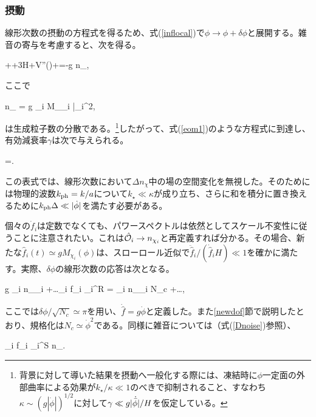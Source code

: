 \subsubsection{摂動}

線形次数の摂動の方程式を得るため、式(\ref{inflocal})で$\phi\to\phi+\delta\phi$と展開する。雑音の寄与を考慮すると、次を得る。

\be
\label{pertinflocal}
\ddot{\delta\phi}+\delta\phi+3H\dot{\delta\phi}+V''(\phi)\delta\phi+\dot{\delta\phi}=-g \Delta n_{\chi},\ee

ここで

\beq \label{Dnoise} \Delta n_{\chi} = g \sum_i M_{\chi_i} \Delta \bar \chi_i^2, \eeq

は生成粒子数の分散である。\footnote{背景に対して導いた結果を摂動へ一般化する際には、凍結時に$\phi$一定面の外部曲率による効果が$k_\star/\kappa\ll1$のべきで抑制されること、すなわち$\kappa\sim(g|\dot\phi|)^{1/2}$に対して$\gamma\ll g|\dot{{\bar\phi}}|/H$を仮定している。}したがって、式(\ref{eom1})のような方程式に到達し、有効減衰率$\gamma$は次で与えられる。

\be
\gamma=.
\ee

この表式では、線形次数において$\Delta n_\chi$中の場の空間変化を無視した。そのためには物理的波数$k_{\rm ph}=k/a$について$k_\star\ll\kappa$が成り立ち、さらに和を積分に置き換えるために$k_{\rm ph}\Delta\ll|\dot\phi|$を満たす必要がある。

個々の$\dot f_i$は定数でなくても、パワースペクトルは依然としてスケール不変性に従うことに注意されたい。これは$\hat{{\cal O}}_i\to n_{\chi_i}$と再定義すれば分かる。その場合、新たな$\hat f_i(t)\simeq gM_{\chi_i}(\phi)$は、スローロール近似で$\ddot{\hat f}_i/(\dot{\hat f}_iH)\ll1$を確かに満たす。実際、$\delta\phi$の線形次数の応答は次となる。

\beq
g \sum_i \delta n_{\chi_i} \simeq {} \dot{\delta\phi} +\ldots \quad\to\quad \sum_i \dot f_i \delta\calo_i^R =  \sum_i \delta n_{\chi_i} \simeq N_c \gamma \dot\pi +\ldots,
\eeq

ここでは$\delta\phi/\sqrt{N_c}\simeq\pi$を用い、$\dot{\hat f}=g\dot\phi$と定義した。また\ref{newdof}節で説明したとおり、規格化は$N_c\simeq\dot\phi^2$である。同様に雑音については（式(\ref{Dnoise})参照）、

\beq \label{noiseng} \sum_i \dot f_i \delta\calo_i^S\quad \to\quad {}  \Delta n_{\chi}.
\eeq

